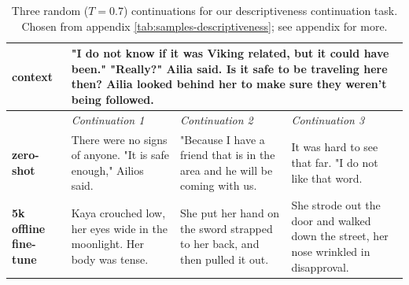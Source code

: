 \begin{table}[t]
\begin{center}
\begin{tabular}{|p{2cm}|p{4cm}|p{4cm}|p{4cm}|}

\hline
    
\hline
\textbf{context}
&
\multicolumn{3}{|C{12cm}|}{ 
"I do not know if it was Viking related, but it could have been."
\newline
"Really?" Ailia said. Is it safe to be traveling here then?  Ailia looked behind her to make sure they weren't being followed.
}
\\
\hline
&
\textit{Continuation 1}
&
\textit{Continuation 2}
&
\textit{Continuation 3}
\\
\hline
\textbf{zero-shot}
&
There were no signs of anyone. 
\newline
"It is safe enough," Ailios said.
&
"Because I have a friend that is in the area and he will be coming with us.
&
It was hard to see that far.  "I do not like that word.
\\
\hline
\textbf{5k offline fine-tune}
&
Kaya crouched low, her eyes wide in the moonlight. Her body was tense.
&
She put her hand on the sword strapped to her back, and then pulled it out.
&
She strode out the door and walked down the street, her nose wrinkled in disapproval.
\\
\hline


\end{tabular}
\caption{Three random ($T=0.7$) continuations for our descriptiveness continuation task.  Chosen from appendix \cref{tab:samples-descriptiveness}; see appendix for more.}
\label{tab:samples-body-descriptiveness}
\end{center}
\vspace{-.1in}
\end{table}
    



